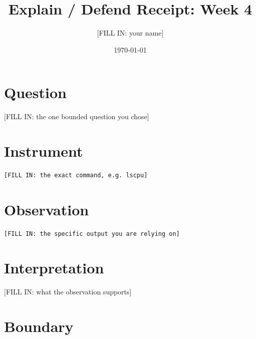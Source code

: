 \documentclass[11pt]{article}
\title{Explain / Defend Receipt: Week 4}
\author{[FILL IN: your name]}
\date{\today}
\begin{document}
\maketitle

\section*{Question}
[FILL IN: the one bounded question you chose]

\section*{Instrument}
\begin{lstlisting}
[FILL IN: the exact command, e.g. lscpu]
\end{lstlisting}

\section*{Observation}
\begin{lstlisting}
[FILL IN: the specific output you are relying on]
\end{lstlisting}

\section*{Interpretation}
[FILL IN: what the observation supports]

\section*{Boundary}
\begin{tcolorbox}
\end{tcolorbox}
\end{document}
